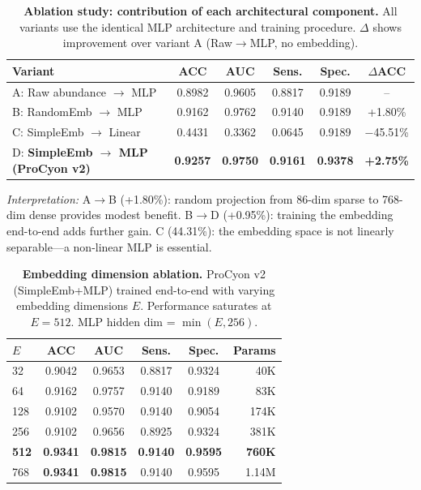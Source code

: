 \begin{table}[t]
\centering
\caption{\textbf{Ablation study: contribution of each architectural component.}
All variants use the identical MLP architecture and training procedure.
$\Delta$ shows improvement over variant A (Raw$\rightarrow$MLP, no embedding).}
\label{tab:ablation}
\begin{tabular}{lccccc}
\toprule
\textbf{Variant} & \textbf{ACC} & \textbf{AUC} & \textbf{Sens.} & \textbf{Spec.} & \textbf{$\Delta$ACC} \\
\midrule
A: Raw abundance $\rightarrow$ MLP & 0.8982 & 0.9605 & 0.8817 & 0.9189 & -- \\
B: RandomEmb $\rightarrow$ MLP & 0.9162 & 0.9762 & 0.9140 & 0.9189 & +1.80\% \\
C: SimpleEmb $\rightarrow$ Linear & 0.4431 & 0.3362 & 0.0645 & 0.9189 & $-$45.51\% \\
D: \textbf{SimpleEmb $\rightarrow$ MLP (ProCyon v2)} & \textbf{0.9257} & \textbf{0.9750} & \textbf{0.9161} & \textbf{0.9378} & \textbf{+2.75\%} \\
\bottomrule
\end{tabular}

\vspace{4pt}
\textit{Interpretation:} A$\rightarrow$B (+1.80\%): random projection from 86-dim sparse to 768-dim dense provides modest benefit.
B$\rightarrow$D (+0.95\%): training the embedding end-to-end adds further gain.
C (44.31\%): the embedding space is not linearly separable—a non-linear MLP is essential.
\end{table}


\begin{table}[t]
\centering
\caption{\textbf{Embedding dimension ablation.}
ProCyon v2 (SimpleEmb+MLP) trained end-to-end with varying embedding dimensions $E$.
Performance saturates at $E=512$. MLP hidden dim = $\min(E, 256)$.}
\label{tab:embedding_dim}
\begin{tabular}{lccccr}
\toprule
\textbf{$E$} & \textbf{ACC} & \textbf{AUC} & \textbf{Sens.} & \textbf{Spec.} & \textbf{Params} \\
\midrule
32  & 0.9042 & 0.9653 & 0.8817 & 0.9324 & 40K \\
64  & 0.9162 & 0.9757 & 0.9140 & 0.9189 & 83K \\
128 & 0.9102 & 0.9570 & 0.9140 & 0.9054 & 174K \\
256 & 0.9102 & 0.9656 & 0.8925 & 0.9324 & 381K \\
\textbf{512} & \textbf{0.9341} & \textbf{0.9815} & \textbf{0.9140} & \textbf{0.9595} & \textbf{760K} \\
768 & \textbf{0.9341} & \textbf{0.9815} & 0.9140 & 0.9595 & 1.14M \\
\bottomrule
\end{tabular}
\end{table}


